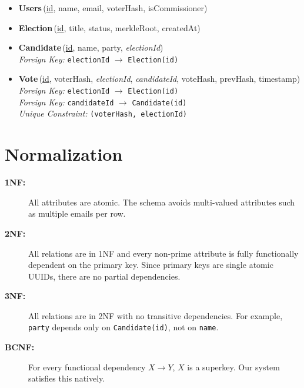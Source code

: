 \documentclass[12pt, a4paper]{article}
\begin{document}
\begin{itemize}
    \item \textbf{Users}\,(\underline{id}, name, email, voterHash, isCommissioner)
    \item \textbf{Election}\,(\underline{id}, title, status, merkleRoot, createdAt)
    \item \textbf{Candidate}\,(\underline{id}, name, party, \textit{electionId}) \\
          \hspace*{1em}\textit{Foreign Key:} \texttt{electionId} $\to$ \texttt{Election(id)}
    \item \textbf{Vote}\,(\underline{id}, voterHash, \textit{electionId}, \textit{candidateId}, voteHash, prevHash, timestamp) \\
          \hspace*{1em}\textit{Foreign Key:} \texttt{electionId} $\to$ \texttt{Election(id)} \\
          \hspace*{1em}\textit{Foreign Key:} \texttt{candidateId} $\to$ \texttt{Candidate(id)} \\
          \hspace*{1em}\textit{Unique Constraint:} \texttt{(voterHash, electionId)}
\end{itemize}

\section{Normalization}

\begin{description}
    \item[\textbf{1NF:}] All attributes are atomic. The schema avoids multi-valued attributes such as multiple emails per row.
    \item[\textbf{2NF:}] All relations are in 1NF and every non-prime attribute is fully functionally dependent on the primary key. Since primary keys are single atomic UUIDs, there are no partial dependencies.
    \item[\textbf{3NF:}] All relations are in 2NF with no transitive dependencies. For example, \texttt{party} depends only on \texttt{Candidate(id)}, not on \texttt{name}.
    \item[\textbf{BCNF:}] For every functional dependency $X \rightarrow Y$, $X$ is a superkey. Our system satisfies this natively.
\end{description}

\newpage
\end{document}
